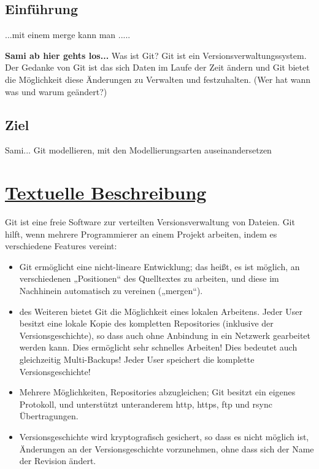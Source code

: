 \documentclass[a4paper]{article}
\begin{document}
\subsection{Einführung} 								%

...mit einem \gls{merge} kann man .....    				%

	\textbf{Sami ab hier gehts los...} 					%
Was ist Git? Git ist ein Versionsverwaltungssystem. 	
Der Gedanke von Git ist das sich Daten im Laufe der Zeit ändern und Git bietet die Möglichkeit
diese Änderungen zu Verwalten und festzuhalten. (Wer hat wann was und warum geändert?)

\subsection{Ziel}
	Sami...
	Git modellieren, mit den Modellierungsarten auseinandersetzen	
\newpage												%
\section{\underline{Textuelle Beschreibung}}

Git ist eine freie Software zur verteilten Versionsverwaltung von Dateien. Git hilft, wenn mehrere Programmierer an einem Projekt arbeiten, indem es verschiedene Features vereint:

  \begin{itemize} 										%
     
\item Git ermöglicht eine nicht-lineare Entwicklung; das heißt, es ist möglich, an verschiedenen „Positionen“ des Quelltextes zu arbeiten, und diese im Nachhinein automatisch zu vereinen („mergen“). %
\item des Weiteren bietet Git die Möglichkeit eines lokalen Arbeitens. Jeder User besitzt eine lokale Kopie des kompletten Repositories (inklusive der Versionsgeschichte), so dass auch ohne Anbindung in ein Netzwerk gearbeitet werden kann. Dies ermöglicht sehr schnelles Arbeiten!
Dies bedeutet auch gleichzeitig Multi-Backups! Jeder User speichert die komplette Versionsgeschichte!
\item Mehrere Möglichkeiten, Repositories abzugleichen; Git besitzt ein eigenes Protokoll, und unterstützt unteranderem http, https, ftp und rsync Übertragungen.
\item Versionsgeschichte wird kryptografisch gesichert, so dass es nicht möglich ist, Änderungen an der Versionsgeschichte vorzunehmen, ohne dass sich der Name der Revision ändert.

    \end{itemize} 										%
\end{document}
